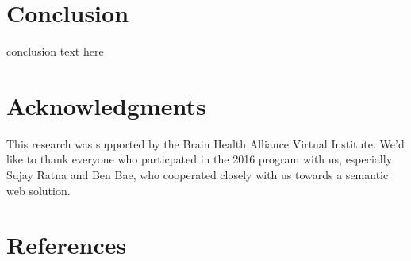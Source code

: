 \documentclass[10pt,twocolumn,twoside]{article}
\begin{document}
\section*{Conclusion}
\label{secConclusion}
conclusion text here


\section*{Acknowledgments}
This research was supported by the Brain Health Alliance Virtual Institute. We'd like to thank everyone who particpated in the 2016 program with us, especially Sujay Ratna and Ben Bae, who cooperated closely with us towards a semantic web solution. 


\section*{References}
\end{document}
